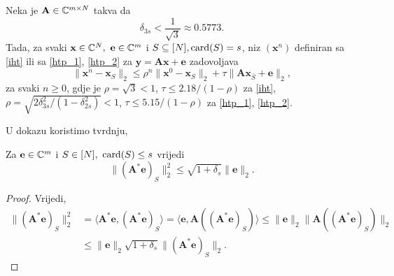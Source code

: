 \documentclass[a4paper,twoside,12pt]{memoir} %
\newcommand{\vect}[1]{\mathbf{#1}}
\renewcommand{\vec}{\vect}
\newcommand{\card}{\text{\normalfont{card}}}
\newcommand{\norm}[1]{\|{#1}\|}
\begin{document}
\begin{thm}\label{tm:6:18}
    Neka je $\vec A \in \C^{m \times N}$ takva da
    \begin{equation}\label{6:28}
        \delta_{3s} < \frac{1}{\sqrt{3}} \approx 0.5773.
    \end{equation}
    Tada, za svaki $\vec x \in \C^{N},\ \vec e \in \C^m$ i $S \subseteq [N], \card(S) = s$, niz $(\vec x^n)$ definiran sa \eqref{iht} ili sa \eqref{htp_1}, \eqref{htp_2} za $\vec y = \vec{Ax}+ \vec e$ zadovoljava
    \begin{equation}\label{6:29}
        \norm{\vec x^n - \vec x_S}_2 \leq \rho^n \norm{\vec x^0 - \vec x_S}_2 + \tau \norm{\vec{Ax}_{\bar S} + \vec e}_2, 
    \end{equation}
    za svaki $n \geq 0$, gdje je $\rho = \sqrt{3} < 1$, $\tau \leq 2.18/(1-\rho)$ za \eqref{iht}, $\rho = \sqrt{2 \delta^2_{3s}/(1-\delta_{2s}^2)} < 1$, $\tau \leq 5.15 / (1- \rho)$ za \eqref{htp_1}, \eqref{htp_2}.
\end{thm}
U dokazu koristimo tvrdnju,
\begin{lem}\label{lem:6:20}
    Za $\vec e \in \C^m$ i $S \in [N],\ \card(S) \leq s$ vrijedi 
    \begin{equation*}
        \norm{(\vec A^* \vec e)_S}_2^2 \leq \sqrt{1+\delta_s}\norm{\vec e}_2.
    \end{equation*}
\end{lem}
\begin{proof}
    Vrijedi,
    \begin{align*}
        \norm{(\vec A^* \vec e)_S}_2^2 &= \langle \vec A^* \vec e, (\vec A^* \vec e)_S  \rangle = \langle \vec e, \vec A ((\vec A^* \vec e)_S)\rangle \leq \norm{\vec e}_2 \norm{\vec A ((\vec A^* \vec e)_S)}_2\\
        &\leq \norm{\vec e}_2 \sqrt{1+\delta_s} \norm{(\vec A^* \vec e)_S}_2.
    \end{align*}
\end{proof}
\end{document}
